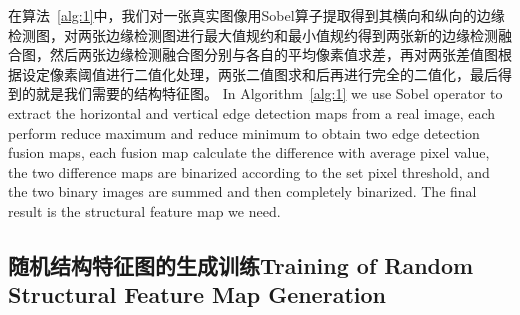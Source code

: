 \documentclass[letterpaper]{article} %
\begin{document}
在算法~\ref{alg:1}中，我们对一张真实图像用Sobel算子提取得到其横向和纵向的边缘检测图，对两张边缘检测图进行最大值规约和最小值规约得到两张新的边缘检测融合图，然后两张边缘检测融合图分别与各自的平均像素值求差，再对两张差值图根据设定像素阈值进行二值化处理，两张二值图求和后再进行完全的二值化，最后得到的就是我们需要的结构特征图。
In Algorithm~\ref{alg:1} we use Sobel operator to extract the horizontal and vertical edge detection maps from a real image, each perform reduce maximum and reduce minimum to obtain two edge detection fusion maps, each fusion map calculate the difference with average pixel value, the two difference maps are binarized according to the set pixel threshold, and the two binary images are summed and then completely binarized. The final result is the structural feature map we need.

\subsection{随机结构特征图的生成训练Training of Random Structural Feature Map Generation}
\end{document}
